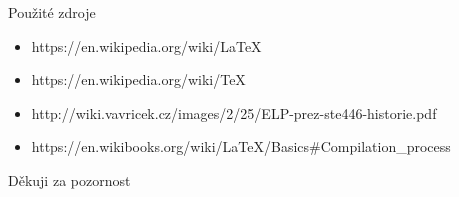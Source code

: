 \documentclass[fyma2,pdf,final]{prosper}
\begin{document}
\begin{slide}[Split]{Použité zdroje}
\begin{itemize}
    \item https://en.wikipedia.org/wiki/LaTeX
    \item https://en.wikipedia.org/wiki/TeX
    \item http://wiki.vavricek.cz/images/2/25/ELP-prez-ste446-historie.pdf
    \item https://en.wikibooks.org/wiki/LaTeX/Basics\#Compilation\_process
\end{itemize}
\end{slide}

\begin{slide}{}
\vspace{42pt}
\begin{center}
  {\large Děkuji za pozornost}
\end{center}
\end{slide}
\end{document}

